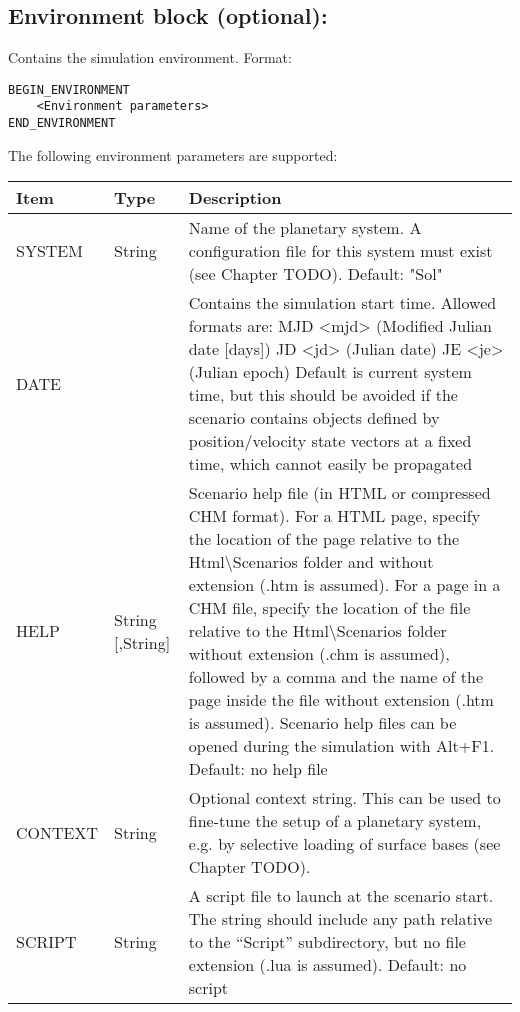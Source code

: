 \documentclass[Orbiter Developer Manual.tex]{subfiles}
\begin{document}
\subsection*{Environment block (optional):}
Contains the simulation environment. Format:

\begin{lstlisting}[language=OSFS]
BEGIN_ENVIRONMENT
	<Environment parameters>
END_ENVIRONMENT
\end{lstlisting}

\noindent
The following environment parameters are supported:

\begin{table}[H]
	\centering
	\begin{tabularx}{\textwidth}{ |l|l|X| }
	\hline\rule{0pt}{2ex}
	\textbf{Item} & \textbf{Type} & \textbf{Description}\\
	\hline\rule{0pt}{2ex}
	SYSTEM & String & Name of the planetary system. A configuration file for this system must exist (see Chapter TODO). Default: "Sol"\\
	\hline\rule{0pt}{2ex}
	DATE &   & Contains the simulation start time. Allowed formats are:\newline
	MJD <mjd> (Modified Julian date [days])\newline
	JD <jd> (Julian date)\newline
	JE <je> (Julian epoch)\newline
	Default is current system time, but this should be avoided if the scenario contains objects defined by position/velocity  state vectors at a fixed time, which cannot easily be propagated\\
	\hline\rule{0pt}{2ex}
	HELP & String [,String] & Scenario help file (in HTML or compressed CHM format). For a HTML page, specify the location of the page relative to the Html\textbackslash Scenarios folder and without extension (.htm is assumed). For a page in a CHM file, specify the location of the file relative to the Html\textbackslash Scenarios folder without extension (.chm is assumed), followed by a comma and the name of the page inside the file without extension (.htm is assumed). Scenario help files can be opened during the simulation with Alt+F1. Default: no help file\\
	\hline\rule{0pt}{2ex}
	CONTEXT & String & Optional context string. This can be used to fine-tune the setup of a planetary system, e.g. by selective loading of surface bases (see Chapter TODO).\\
	\hline\rule{0pt}{2ex}
	SCRIPT & String & A script file to launch at the scenario start. The string should include any path relative to the “Script” subdirectory, but no file extension (.lua is assumed). Default: no script\\
	\hline
	\end{tabularx}
\end{table}
\end{document}
